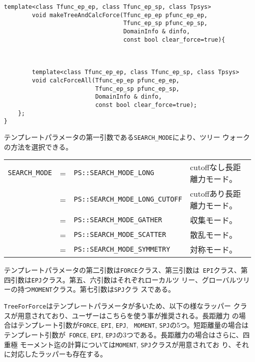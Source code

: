 \begin{lstlisting}[caption=相互作用クラス]
        template<class Tfunc_ep_ep, class Tfunc_ep_sp, class Tpsys>
        void makeTreeAndCalcForce(Tfunc_ep_ep pfunc_ep_ep, 
                                  Tfunc_ep_sp pfunc_ep_sp,  
                                  DomainInfo & dinfo,
                                  const bool clear_force=true){



        template<class Tfunc_ep_ep, class Tfunc_ep_sp, class Tpsys>
        void calcForceAll(Tfunc_ep_ep pfunc_ep_ep, 
                          Tfunc_ep_sp pfunc_ep_sp,  
                          DomainInfo & dinfo,
                          const bool clear_force=true);
    };
}
\end{lstlisting}

テンプレートパラメータの第一引数である{\tt SEARCH\_MODE}により、ツリー
ウォークの方法を選択できる。

\mbox{}
\begin{table}[h!]
\begin{tabular}{llll}
{\tt SEARCH\_MODE} &=& {\tt PS::SEARCH\_MODE\_LONG} & cutoffなし長距離力モード。　\\
     	          &=& {\tt PS::SEARCH\_MODE\_LONG\_CUTOFF} & cutoffあり長距離力モード。　\\
     	          &=& {\tt PS::SEARCH\_MODE\_GATHER} & 収集モード。　\\
     	          &=& {\tt PS::SEARCH\_MODE\_SCATTER} & 散乱モード。　\\
     	          &=& {\tt PS::SEARCH\_MODE\_SYMMETRY} & 対称モード。
\end{tabular}
\end{table}
\mbox{}

テンプレートパラメータの第二引数は{\tt FORCE}クラス、第三引数は{\tt
EPI}クラス、第四引数は{\tt EPJ}クラス。第五、六引数はそれぞれローカルツ
リー、グローバルツリーの持つ{\tt MOMENT}クラス。第七引数は{\tt SPJ}クラ
スである。

{\tt TreeForForce}はテンプレートパラメータが多いため、以下の様なラッパー
クラスが用意されており、ユーザーはこちらを使う事が推奨される。長距離力
の場合はテンプレート引数が{\tt FORCE}, {\tt EPI}, {\tt EPJ}, {\tt
MOMENT}, {\tt SPJ}の5つ。短距離量の場合はテンプレート引数が{\tt
FORCE}, {\tt EPI}, {\tt EPJ}の3つである。長距離力の場合はさらに、四重極
モーメント迄の計算については{\tt MOMENT}, {\tt SPJ}クラスが用意されてお
り、それに対応したラッパーも存在する。


